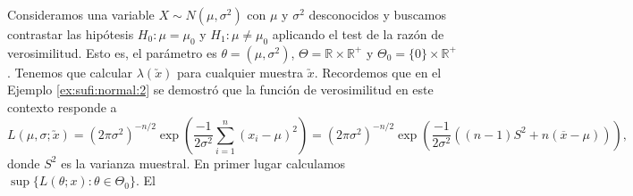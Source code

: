         \begin{ex}
            Consideramos una variable $X \sim N(\mu, \sigma^2)$ con $\mu$ y $\sigma^2$ desconocidos y buscamos contrastar las hipótesis $H_0: \mu = \mu_0$ y $H_1: \mu \ne \mu_0$ aplicando el test de la razón de verosimilitud. Esto es, el parámetro es $\theta = (\mu, \sigma^2)$, $\Theta = \mathbb{R}\times\mathbb{R}^+$ y $\Theta_0 = \{0\}\times\mathbb{R}^+$. Tenemos que calcular $\lambda(\utilde{x})$ para cualquier muestra $\utilde{x}$. Recordemos que en el Ejemplo \ref{ex:sufi:normal:2} se demostró que la función de verosimilitud en este contexto responde a
            \[L(\mu, \sigma; \utilde{x}) = (2 \pi \sigma^2)^{-n/2} \exp\left(\frac{-1}{2 \sigma^2} \sum_{i = 1}^n (x_i - \mu)^2\right) = (2 \pi \sigma^2)^{-n/2} \exp\left(\frac{-1}{2 \sigma^2} ((n-1)S^2 + n(\overline{x}-\mu))\right),\]
            donde $S^2$ es la varianza muestral. En primer lugar calculamos  $\sup\{L(\theta; x): \theta \in \Theta_0\}$. El


        \end{ex}
